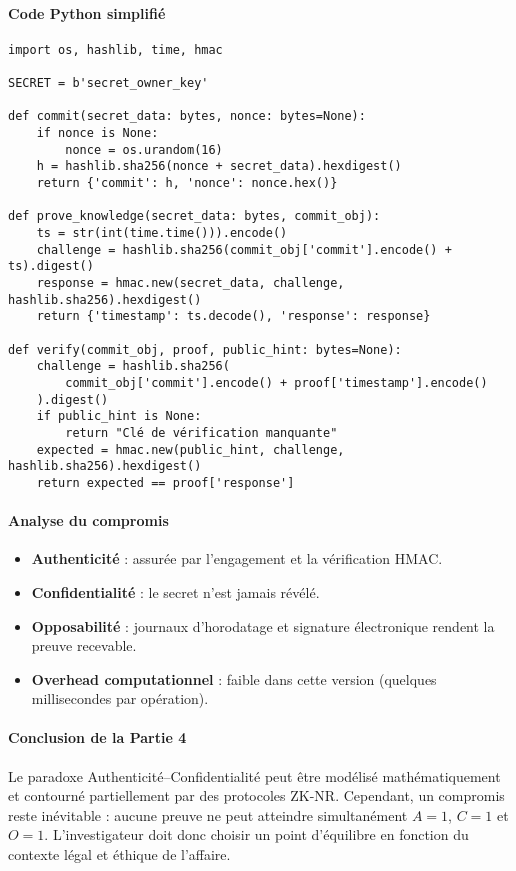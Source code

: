 \documentclass[11pt]{article}
\begin{document}
\paragraph{Code Python simplifié}
\begin{lstlisting}
import os, hashlib, time, hmac

SECRET = b'secret_owner_key'

def commit(secret_data: bytes, nonce: bytes=None):
    if nonce is None:
        nonce = os.urandom(16)
    h = hashlib.sha256(nonce + secret_data).hexdigest()
    return {'commit': h, 'nonce': nonce.hex()}

def prove_knowledge(secret_data: bytes, commit_obj):
    ts = str(int(time.time())).encode()
    challenge = hashlib.sha256(commit_obj['commit'].encode() + ts).digest()
    response = hmac.new(secret_data, challenge, hashlib.sha256).hexdigest()
    return {'timestamp': ts.decode(), 'response': response}

def verify(commit_obj, proof, public_hint: bytes=None):
    challenge = hashlib.sha256(
        commit_obj['commit'].encode() + proof['timestamp'].encode()
    ).digest()
    if public_hint is None:
        return "Clé de vérification manquante"
    expected = hmac.new(public_hint, challenge, hashlib.sha256).hexdigest()
    return expected == proof['response']
\end{lstlisting}

\paragraph{Analyse du compromis}
\begin{itemize}
  \item \textbf{Authenticité} : assurée par l’engagement et la vérification HMAC.
  \item \textbf{Confidentialité} : le secret n’est jamais révélé.
  \item \textbf{Opposabilité} : journaux d’horodatage et signature électronique rendent la preuve recevable.
  \item \textbf{Overhead computationnel} : faible dans cette version (quelques millisecondes par opération).
\end{itemize}

\paragraph{Conclusion de la Partie 4}  
Le paradoxe Authenticité–Confidentialité peut être modélisé mathématiquement et contourné partiellement par des protocoles ZK-NR.  
Cependant, un compromis reste inévitable : aucune preuve ne peut atteindre simultanément $A=1$, $C=1$ et $O=1$.  
L’investigateur doit donc choisir un point d’équilibre en fonction du contexte légal et éthique de l’affaire.
\newpage
\end{document}
